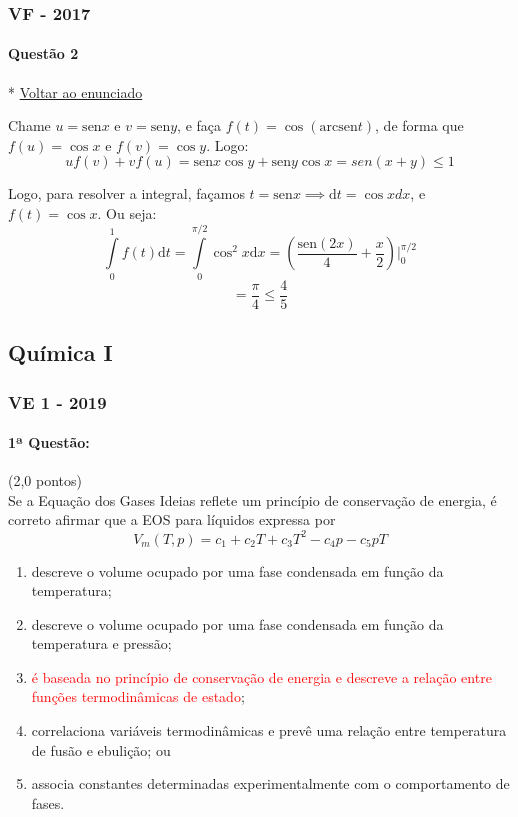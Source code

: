 \documentclass[12pt,a4paper]{article}
\newcommand{\sen}{\mathrm{sen}}
\newcommand{\dd}{\mathrm{d}}
\begin{document}
\newpage

\subsubsection{VF - 2017}

\paragraph{Questão 2} \hfill \scriptsize \hypertarget{calculovf2017q2ida}{* }\hyperlink{calculovf2017q2volta}{Voltar ao enunciado}\normalsize

 Chame $u = \sen x$ e $v = \sen y$, e faça $f(t) = \cos \left( \mathrm{arcsen} t  \right)$, de forma que $f(u) = \cos x$ e $f(v) = \cos y $. Logo: $$uf(v) + vf(u) = \sen x \cos y + \sen y \cos x = sen(x+y) \le 1$$

Logo, para resolver a integral, façamos $t = \sen x \implies \dd t = \cos x dx$, e $f(t) = \cos x$. Ou seja: $$\int\limits_0^1 f(t) \dd t = \int\limits_0^{\pi / 2} \cos^2 x \dd x = \left(\dfrac{\sen (2x)}{4} + \dfrac{x}{2} \right)\Biggr |_0^{\pi / 2}$$ $$= \dfrac{\pi}{4} \le \dfrac{4}{5}$$

\newpage


\subsection{Química I}

\subsubsection{VE 1 - 2019}

\paragraph{1ª Questão:} (2,0 pontos) \\ [0.2cm]


Se a Equação dos Gases Ideias reflete um princípio de conservação de energia, é correto afirmar que a EOS para líquidos expressa por 
\begin{equation*}
    V_{m}(T, p) = c_{1} + c_{2}T + c_{3} T^{2} - c_{4} p - c_{5}pT    
\end{equation*}

\begin{enumerate} [label = (\alph*)]
    \item descreve o volume ocupado por uma fase condensada em função da temperatura;
    \item descreve o volume ocupado por uma fase condensada em função da temperatura e pressão;
    \item \textcolor{red}{é baseada no princípio de conservação de energia e descreve a relação entre funções termodinâmicas de estado};
    \item correlaciona variáveis termodinâmicas e prevê uma relação entre temperatura de fusão e ebulição; ou 
    \item associa constantes determinadas experimentalmente com o comportamento de fases.
\end{enumerate} \\ 
\end{document}
